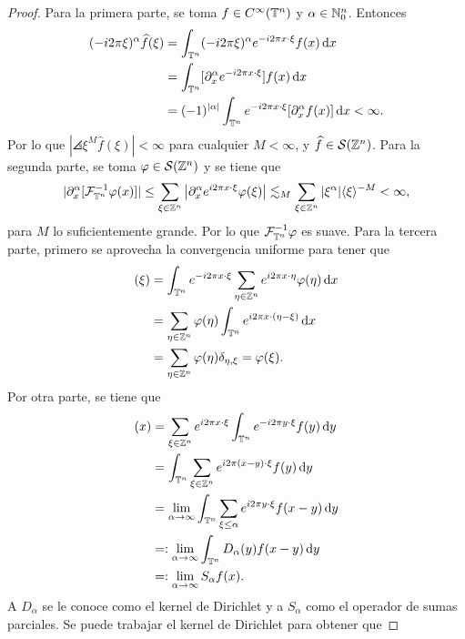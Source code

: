 \begin{proof}
	Para la primera parte, se toma $f\in C^\infty(\mathbb{T}^n)$ y $\alpha\in\mathbb{N}_0^n$. Entonces 
	\begin{align*}
		(-i2\pi\xi)^\alpha \widehat{f}(\xi) & =  \int_{\mathbb{T}^n}(-i2\pi\xi)^\alpha e^{-i2\pi x\cdot\xi} f(x) \mathop{}\!\mathrm{d} x \\ 
		& =  \int_{\mathbb{T}^n} [\partial^\alpha_xe^{-i2\pi x\cdot\xi} ]f(x) \mathop{}\!\mathrm{d} x\\
		& = (-1)^{|\alpha|}  \int_{\mathbb{T}^n} e^{-i2\pi x\cdot\xi} [\partial^\alpha_xf(x)] \mathop{}\!\mathrm{d} x < \infty.
	\end{align*}
	Por lo que $|\angles{\xi}^M\widehat{f}(\xi)| < \infty$ para cualquier $M<\infty$, y $\widehat{f}\in\mathcal{S}(\mathbb{Z}^n)$. Para la segunda parte, se toma $\varphi\in\mathcal{S}(\mathbb{Z}^n)$ y se tiene que 
	\begin{equation*}
		|\partial^\alpha_x[\mathcal{F}_{\mathbb{T}^n}^{-1}\varphi(x)]| \leq \sum_{\xi\in\mathbb{Z}^n}	\left|   	\partial^\alpha_xe^{i2\pi x\cdot\xi} \varphi(\xi)
		\right| \lesssim_M \sum_{\xi\in\mathbb{Z}^n} |\xi^\alpha| \langle\xi\rangle^{-M} < \infty,
	\end{equation*}
	 para $M$ lo suficientemente grande. Por lo que $\mathcal{F}_{\mathbb{T}^n}^{-1}\varphi$ es suave. Para la tercera parte, primero se aprovecha la convergencia uniforme para tener que 
	\begin{align*}
		[\mathcal{F}_{\T^n} (\mathcal{F}_{\T^n}^{-1}\varphi)](\xi) &=  \int_{\T^n} e^{-i2\pi x\cdot\xi} \sum_{\eta\in\Z^n} e^{i2\pi x\cdot\eta}\varphi(\eta) \diff x \\
		& =  \sum_{\eta\in\Z^n}\varphi(\eta) \int_{\T^n} e^{i2\pi x\cdot(\eta-\xi)} \diff x \\
		& = \sum_{\eta\in\Z^n}\varphi(\eta) \delta_{\eta,\xi} = \varphi(\xi).
	\end{align*}
	Por otra parte, se tiene que 
	\begin{align*}
		[\mathcal{F}_{\T^n}^{-1} (\mathcal{F}_{\T^n}f)](x)  & = \sum_{\xi\in\Z^n} e^{i2\pi x\cdot\xi} \int_{\T^n} e^{-i2\pi y\cdot\xi} f(y)\diff y \\
		& =  \int_{\T^n} \sum_{\xi\in\Z^n}e^{i2\pi (x-y)\cdot\xi} f(y)\diff y \\
		& = \lim_{\alpha\to\infty}  \int_{\T^n} \sum_{\xi\leq\alpha} e^{i2\pi y\cdot\xi} f(x-y)\diff y\\
		& =: \lim_{\alpha\to\infty}  \int_{\T^n} D_\alpha(y)f(x-y)\diff y \\
		&=: \lim_{\alpha\to\infty}  S_\alpha f(x).
	\end{align*}
	A $D_\alpha$ se le conoce como el kernel de Dirichlet y a $S_\alpha$ como el operador de sumas parciales. Se puede trabajar el kernel de Dirichlet para obtener que 

\end{proof}
